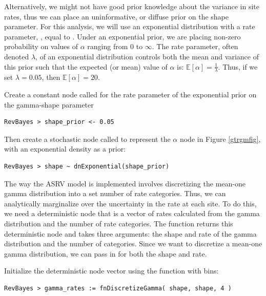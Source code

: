 Alternatively, we might not have good prior knowledge about the variance in site rates, thus we can place an uninformative, or diffuse prior on the shape parameter.
For this analysis, we will use an exponential distribution with a rate parameter, , equal to .
Under an exponential prior, we are placing non-zero probability on values of $\alpha$ ranging from 0 to $\infty$. 
The rate parameter, often denoted $\lambda$, of an exponential distribution controls both the mean and variance of this prior such that the expected (or mean) value of $\alpha$ is:
$\mathbb{E}[\alpha] = \frac{1}{\lambda}.$
Thus, if we set $\lambda=0.05$, then $\mathbb{E}[\alpha] = 20$.

Create a constant node called  for the rate parameter of the exponential prior on the gamma-shape parameter
{\tt\begin{snugshade*}
\begin{lstlisting}
RevBayes > shape_prior <- 0.05                                                                             
\end{lstlisting}
\end{snugshade*}}

Then create a stochastic node called  to represent the $\alpha$ node in Figure \ref{gtrgmfig}, with an exponential density as a prior:
{\tt\begin{snugshade*}
\begin{lstlisting}
RevBayes > shape ~ dnExponential(shape_prior)

\end{lstlisting}
\end{snugshade*}}

The way the ASRV model is implemented involves discretizing the mean-one gamma distribution into a set number of rate categories. Thus, we can analytically marginalize over the uncertainty in the rate at each site. To do this, we need a deterministic node that is a vector of rates calculated from the gamma distribution and the number of rate categories. The  function returns this deterministic node and takes three arguments: the shape and rate of the gamma distribution and the number of categories. Since we want to discretize a mean-one gamma distribution, we can pass in  for both the shape and rate.

Initialize the  deterministic node vector using the   function with  bins:
{\tt \begin{snugshade*}
\begin{lstlisting}
RevBayes > gamma_rates := fnDiscretizeGamma( shape, shape, 4 )
\end{lstlisting}
\end{snugshade*}}



